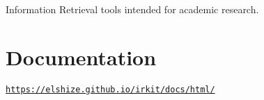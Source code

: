 Information Retrieval tools intended for academic research.

\section*{Documentation}

\href{https://elshize.github.io/irkit/docs/html/}{\tt https\+://elshize.\+github.\+io/irkit/docs/html/} 